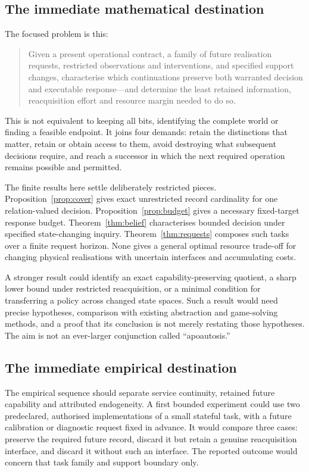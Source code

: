 \subsection{The immediate mathematical destination}

The focused problem is this:

\begin{quote}
Given a present operational contract, a family of future realisation requests, restricted observations and interventions, and specified support changes, characterise which continuations preserve both warranted decision and executable response---and determine the least retained information, reacquisition effort and resource margin needed to do so.
\end{quote}

This is not equivalent to keeping all bits, identifying the complete world or finding a feasible endpoint. It joins four demands: retain the distinctions that matter, retain or obtain access to them, avoid destroying what subsequent decisions require, and reach a successor in which the next required operation remains possible and permitted.

The finite results here settle deliberately restricted pieces. Proposition~\ref{prop:cover} gives exact unrestricted record cardinality for one relation-valued decision. Proposition~\ref{prop:budget} gives a necessary fixed-target response budget. Theorem~\ref{thm:belief} characterises bounded decision under specified state-changing inquiry. Theorem~\ref{thm:requests} composes such tasks over a finite request horizon. None gives a general optimal resource trade-off for changing physical realisations with uncertain interfaces and accumulating costs.

A stronger result could identify an exact capability-preserving quotient, a sharp lower bound under restricted reacquisition, or a minimal condition for transferring a policy across changed state spaces. Such a result would need precise hypotheses, comparison with existing abstraction and game-solving methods, and a proof that its conclusion is not merely restating those hypotheses. The aim is not an ever-larger conjunction called ``apoautosis.''

\subsection{The immediate empirical destination}

The empirical sequence should separate service continuity, retained future capability and attributed endogeneity. A first bounded experiment could use two predeclared, authorised implementations of a small stateful task, with a future calibration or diagnostic request fixed in advance. It would compare three cases: preserve the required future record, discard it but retain a genuine reacquisition interface, and discard it without such an interface. The reported outcome would concern that task family and support boundary only.

